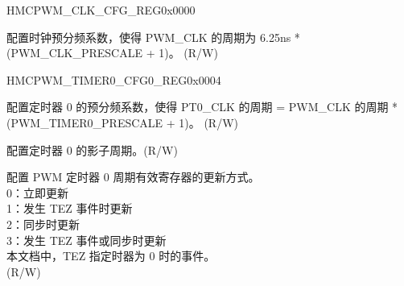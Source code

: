 \begin{register}{H}{MCPWM\_CLK\_CFG\_REG}{0x0000}\label{regdesc:MCPWMCLKCFGREG}
%
%
\regnewline%
\begin{regdesc}\begin{reglist}
\label{fielddesc:MCPWMCLKPRESCALE}\item [MCPWM\_CLK\_PRESCALE] 配置时钟预分频系数，使得 PWM\_CLK 的周期为 6.25ns * (PWM\_CLK\_PRESCALE + 1)。 (R/W)
\end{reglist}\end{regdesc}
\end{register}


\begin{register}{H}{MCPWM\_TIMER0\_CFG0\_REG}{0x0004}\label{regdesc:MCPWMTIMER0CFG0REG}
%
%
%
%
\regnewline%
\begin{regdesc}\begin{reglist}
\label{fielddesc:MCPWMTIMER0PRESCALE}\item [MCPWM\_TIMER0\_PRESCALE] 配置定时器 0 的预分频系数，使得 PT0\_CLK 的周期 = PWM\_CLK 的周期 * (PWM\_TIMER0\_PRESCALE + 1)。 (R/W)
\label{fielddesc:MCPWMTIMER0PERIOD}\item [MCPWM\_TIMER0\_PERIOD] 配置定时器 0 的影子周期。(R/W)
\label{fielddesc:MCPWMTIMER0PERIODUPMETHOD}\item [MCPWM\_TIMER0\_PERIOD\_UPMETHOD] 配置 PWM 定时器 0 周期有效寄存器的更新方式。\\
0：立即更新\\
1：发生 TEZ 事件时更新\\
2：同步时更新\\
3：发生 TEZ 事件或同步时更新\\
本文档中，TEZ 指定时器为 0 时的事件。\\ (R/W)
\end{reglist}\end{regdesc}
\end{register}


